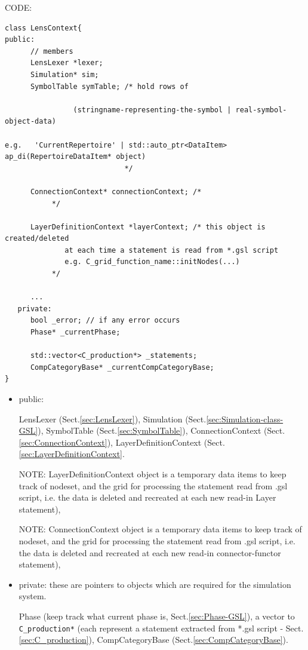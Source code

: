 CODE:
\begin{lstlisting}
class LensContext{
public:
      // members
      LensLexer *lexer;
      Simulation* sim;                                                                                                                                                                                 
      SymbolTable symTable; /* hold rows of
                
                (stringname-representing-the-symbol | real-symbol-object-data)
                
e.g.   'CurrentRepertoire' | std::auto_ptr<DataItem> ap_di(RepertoireDataItem* object) 
                            */
                     
      ConnectionContext* connectionContext; /* 
           */
           
      LayerDefinitionContext *layerContext; /* this object is created/deleted
              at each time a statement is read from *.gsl script
              e.g. C_grid_function_name::initNodes(...)
           */
      
      ...
   private:
      bool _error; // if any error occurs
      Phase* _currentPhase;
      
      std::vector<C_production*> _statements;
      CompCategoryBase* _currentCompCategoryBase;
}
\end{lstlisting}

\begin{itemize}
  \item public:

LensLexer (Sect.\ref{sec:LensLexer}), Simulation
(Sect.\ref{sec:Simulation-class-GSL}), SymbolTable
(Sect.\ref{sec:SymbolTable}), ConnectionContext
(Sect.\ref{sec:ConnectionContext}), LayerDefinitionContext
(Sect.\ref{sec:LayerDefinitionContext}.

NOTE: LayerDefinitionContext object is a temporary data items to keep track of
nodeset, and the grid for processing the statement read from .gsl script, i.e.
the data is deleted and recreated at each new read-in Layer statement),

NOTE: ConnectionContext object is a temporary data items to keep track of
nodeset, and the grid for processing the statement read from .gsl script, i.e.
the data is deleted and recreated at each new read-in
connector-functor statement),

  \item private: these are pointers to objects which are required for the
  simulation system.
  
Phase (keep track what current phase is, Sect.\ref{sec:Phase-GSL}), a vector to
\verb!C_production*! (each represent a statement extracted from *.gsl script -
Sect.\ref{sec:C_production}), CompCategoryBase
(Sect.\ref{sec:CompCategoryBase}).

\end{itemize}

